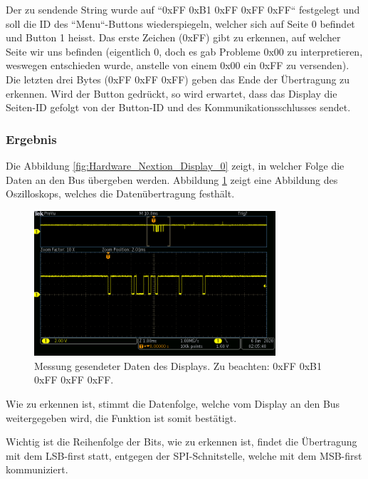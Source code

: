 Der zu sendende String  wurde auf ``0xFF 0xB1 0xFF 0xFF 0xFF`` festgelegt und soll die ID des ``Menu``-Buttons wiederspiegeln, welcher sich auf Seite 0 befindet und Button 1 heisst. Das erste Zeichen (0xFF) gibt zu erkennen, auf welcher Seite wir uns befinden (eigentlich 0, doch es gab Probleme 0x00 zu interpretieren, weswegen entschieden wurde, anstelle von einem 0x00 ein 0xFF zu versenden). Die letzten drei Bytes (0xFF 0xFF 0xFF) geben das Ende der Übertragung zu erkennen. Wird der Button gedrückt, so wird erwartet, dass das Display die Seiten-ID gefolgt von der Button-ID und des Kommunikationsschlusses sendet.

\subsubsection{Ergebnis}\label{subsubsec:Hardware_Display_Ergebnis}
Die Abbildung \ref{fig:Hardware_Nextion_Display_0} zeigt, in welcher Folge die Daten an den Bus übergeben werden. Abbildung \ref{fig:Hardware_Nextion_Display_1} zeigt eine Abbildung des Oszilloskops, welches die Datenübertragung festhält. 

\begin{figure}[h!]
	\centering
	\includegraphics[width=0.8\textwidth]{graphics/Messung_UART_Nextion_Display.png}
	\caption{Messung gesendeter Daten des Displays. Zu beachten: 0xFF 0xB1 0xFF 0xFF 0xFF.} 
	\label{fig:Hardware_Nextion_Display_1}
\end{figure}

Wie zu erkennen ist, stimmt die Datenfolge, welche vom Display an den Bus weitergegeben wird, die Funktion ist somit bestätigt.

Wichtig ist die Reihenfolge der Bits, wie zu erkennen ist, findet die Übertragung mit dem LSB-first statt, entgegen der SPI-Schnitstelle, welche mit dem MSB-first kommuniziert.